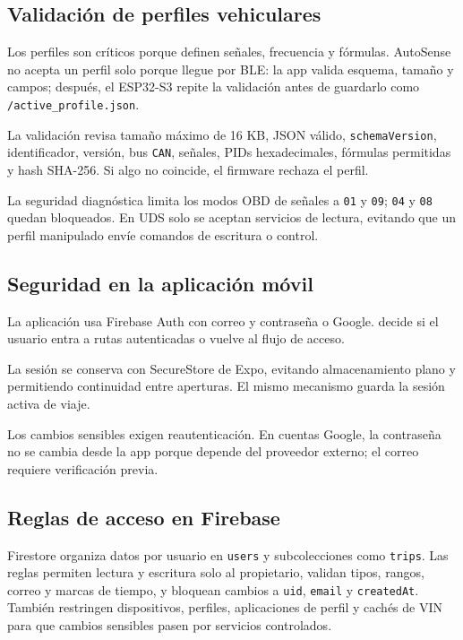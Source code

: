 \documentclass[12pt,letterpaper]{report}
\begin{document}
\subsection{Validación de perfiles vehiculares}

Los perfiles son críticos porque definen señales, frecuencia y fórmulas. AutoSense no acepta un perfil solo porque llegue por BLE: la app valida esquema, tamaño y campos; después, el ESP32-S3 repite la validación antes de guardarlo como \texttt{/active\_profile.json}.

La validación revisa tamaño máximo de 16 KB, JSON válido, \texttt{schemaVersion}, identificador, versión, bus \texttt{CAN}, señales, PIDs hexadecimales, fórmulas permitidas y hash SHA-256. Si algo no coincide, el firmware rechaza el perfil.

La seguridad diagnóstica limita los modos OBD de señales a \texttt{01} y \texttt{09}; \texttt{04} y \texttt{08} quedan bloqueados. En UDS solo se aceptan servicios de lectura, evitando que un perfil manipulado envíe comandos de escritura o control.

\subsection{Seguridad en la aplicación móvil}

La aplicación usa Firebase Auth con correo y contraseña o Google.  decide si el usuario entra a rutas autenticadas o vuelve al flujo de acceso.

La sesión se conserva con SecureStore de Expo, evitando almacenamiento plano y permitiendo continuidad entre aperturas. El mismo mecanismo guarda la sesión activa de viaje.

Los cambios sensibles exigen reautenticación. En cuentas Google, la contraseña no se cambia desde la app porque depende del proveedor externo; el correo requiere verificación previa.

\subsection{Reglas de acceso en Firebase}

Firestore organiza datos por usuario en \texttt{users} y subcolecciones como \texttt{trips}. Las reglas permiten lectura y escritura solo al propietario, validan tipos, rangos, correo y marcas de tiempo, y bloquean cambios a \texttt{uid}, \texttt{email} y \texttt{createdAt}. También restringen dispositivos, perfiles, aplicaciones de perfil y cachés de VIN para que cambios sensibles pasen por servicios controlados.
\end{document}
